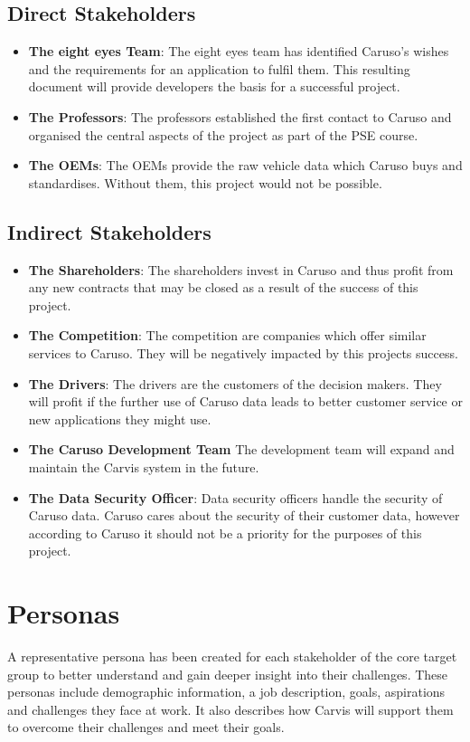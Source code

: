 \subsection{Direct Stakeholders}
\begin{itemize}
  \item \textbf{The eight eyes Team}: The eight eyes team has identified Caruso's wishes and the requirements for an application to fulfil them. This resulting document will provide developers the basis for a successful project.
  \item \textbf{The Professors}: The professors established the first contact to Caruso and organised the central aspects of the project as part of the PSE course.
  \item \textbf{The OEMs}: The OEMs provide the raw vehicle data which Caruso buys and standardises. Without them, this project would not be possible.
\end{itemize}

\subsection{Indirect Stakeholders}
\begin{itemize}
  \item \textbf{The Shareholders}: The shareholders invest in Caruso and thus profit from any new contracts that may be closed as a result of the success of this project.
  \item \textbf{The Competition}: The competition are companies which offer similar services to Caruso. They will be negatively impacted by this projects success.
  \item \textbf{The Drivers}: The drivers are the customers of the decision makers. They will profit if the further use of Caruso data leads to better customer service or new applications they might use.
  \item \textbf{The Caruso Development Team} The development team will expand and maintain the Carvis system in the future.
  \item \textbf{The Data Security Officer}: Data security officers handle the security of Caruso data. Caruso cares about the security of their customer data, however according to Caruso it should not be a priority for the purposes of this project.
\end{itemize}

\section{Personas}
A representative persona has been created for each stakeholder of the core target group to better understand and gain deeper insight into their challenges. These personas include demographic information, a job description, goals, aspirations and challenges they face at work. It also describes how Carvis will support them to overcome their challenges and meet their goals.

